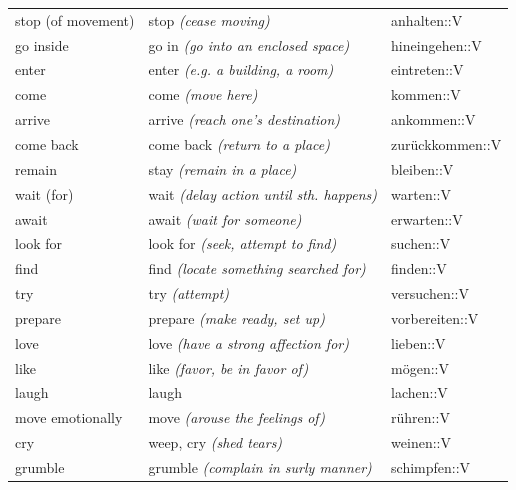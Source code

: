 \begin{center}
\begin{longtable}{lll}
{\sc \lowercase{	STOP \footnotesize (OF MOVEMENT)	}}	&	stop	\textit{\footnotesize (cease moving)}	&	anhalten::V	\\
{\sc \lowercase{	GO INSIDE	}}	&	go in	\textit{\footnotesize (go into an enclosed space)}	&	hineingehen::V	\\
{\sc \lowercase{	ENTER	}}	&	enter	\textit{\footnotesize (e.g. a building, a room)}	&	eintreten::V	\\
{\sc \lowercase{	COME	}}	&	come	\textit{\footnotesize (move here)}	&	kommen::V	\\
{\sc \lowercase{	ARRIVE	}}	&	arrive	\textit{\footnotesize (reach one's destination)}	&	ankommen::V	\\
{\sc \lowercase{	COME BACK	}}	&	come back	\textit{\footnotesize (return to a place)}	&	zurückkommen::V	\\
{\sc \lowercase{	REMAIN	}}	&	stay	\textit{\footnotesize (remain in a place)}	&	bleiben::V	\\
{\sc \lowercase{	WAIT \footnotesize (FOR)	}}	&	wait	\textit{\footnotesize (delay action until sth. happens)}	&	warten::V	\\
{\sc \lowercase{	AWAIT	}}	&	await	\textit{\footnotesize (wait for someone)}	&	erwarten::V	\\
{\sc \lowercase{	LOOK FOR	}}	&	look for	\textit{\footnotesize (seek, attempt to find)}	&	suchen::V	\\
{\sc \lowercase{	FIND	}}	&	find	\textit{\footnotesize (locate something searched for)}	&	finden::V	\\
{\sc \lowercase{	TRY	}}	&	try	\textit{\footnotesize (attempt)}	&	versuchen::V	\\
{\sc \lowercase{	PREPARE	}}	&	prepare	\textit{\footnotesize (make ready, set up)}	&	vorbereiten::V	\\
{\sc \lowercase{	LOVE	}}	&	love	\textit{\footnotesize (have a strong affection for)}	&	lieben::V	\\
{\sc \lowercase{	LIKE	}}	&	like	\textit{\footnotesize (favor, be in favor of)}	&	mögen::V	\\
{\sc \lowercase{	LAUGH	}}	&	laugh		&	lachen::V	\\
{\sc \lowercase{	MOVE EMOTIONALLY	}}	&	move	\textit{\footnotesize (arouse the feelings of)}	&	rühren::V	\\
{\sc \lowercase{	CRY	}}	&	weep, cry	\textit{\footnotesize (shed tears)}	&	weinen::V	\\
{\sc \lowercase{	GRUMBLE	}}	&	grumble	\textit{\footnotesize (complain in surly manner)}	&	schimpfen::V	\\

\end{longtable}
\end{center}
